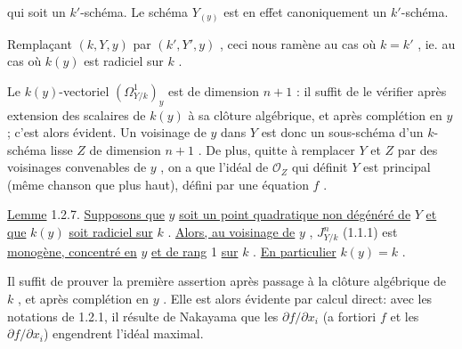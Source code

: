 \begin{center}
\end{center}
qui soit un $k'$-schéma. Le schéma $Y_{(y)}$ est en effet canoniquement un $k'$-schéma.



Remplaçant $(k,Y,y)$ par $(k',Y',y)$ , ceci nous ramène au cas où $k = k'$ , ie. au cas où $k(y)$ est radiciel sur $k$ .

Le $k(y)$-vectoriel $(\Omega^1_{Y/k})_y$ est de dimension $n+1$ : il suffit de le vérifier après extension des scalaires de $k(y)$ à sa clôture algébrique, et après complétion en $y$ ; c'est alors évident. Un voisinage de $y$ dans $Y$ est donc un sous-schéma d'un $k$-schéma lisse $Z$ de dimension $n+1$ . De plus, quitte à remplacer $Y$ et $Z$ par des voisinages convenables de $y$ , on a que l'idéal de $\mathcal{O}_Z$ qui définit $Y$ est principal (même chanson que plus haut), défini par une équation $f$ .

\underline{Lemme} 1.2.7. \underline{Supposons que} $y$ \underline{soit un point quadratique non dégénéré de} $Y$ \underline{et que} $k(y)$ \underline{soit radiciel sur} $k$ . \underline{Alors, au voisinage de} $y$ , $J^n_{Y/k}$ (1.1.1) est \underline{monogène, concentré en} $y$ \underline{et de rang} 1 \underline{sur} $k$ . \underline{En particulier} $k(y) = k$ .

Il suffit de prouver la première assertion après passage à la clôture algébrique de $k$ , et après complétion en $y$ . Elle est alors évidente par calcul direct: avec les notations de 1.2.1, il résulte de Nakayama que les $\partial f/\partial x_i$ (a fortiori $f$ et les $\partial f/\partial x_i$) engendrent l'idéal maximal.

